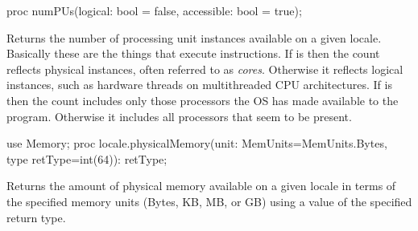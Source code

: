 \begin{protohead}
proc numPUs(logical: bool = false, accessible: bool = true);
\end{protohead}
\begin{protobody}
Returns the number of processing unit instances
available on a given locale.
Basically these are the things that execute instructions.
If  is 
then the count reflects physical instances,
often referred to as {\em cores}.
Otherwise it reflects logical instances,
such as hardware threads on multithreaded CPU architectures.
If  is 
then the count includes only those processors
the OS has made available to the program.
Otherwise it includes all processors that seem to be present.
\end{protobody}

\begin{protohead}
use Memory;
proc locale.physicalMemory(unit: MemUnits=MemUnits.Bytes, type retType=int(64)): retType;
\end{protohead}
\begin{protobody}
Returns the amount of physical memory available on a given locale in
terms of the specified memory units (Bytes, KB, MB, or GB) using a
value of the specified return type.
\end{protobody}





